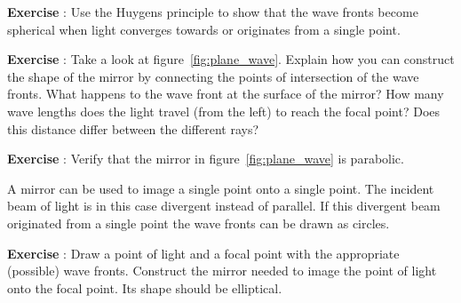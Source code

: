 \documentclass[12pt,a4paper]{article}
\numberwithin{equation}{section}
\numberwithin{figure}{section}
\newcounter{Exercise}
\numberwithin{table}{section}
\begin{document}
\begin{shaded}
\textbf{Exercise \theExercise {}} : Use the Huygens principle to show that the wave fronts become spherical when light converges towards or originates from a single point.\end{shaded}
\begin{shaded}
\textbf{Exercise \theExercise {}} : Take a look at figure~\ref{fig:plane_wave}. Explain how you can construct the shape of the mirror by connecting the points of intersection of the wave fronts. What happens to the wave front at the surface of the mirror? How many wave lengths does the light travel (from the left) to reach the focal point? Does this distance differ between the different rays?\end{shaded}
\begin{shaded}
\textbf{Exercise \theExercise {}} : Verify that the mirror in figure~\ref{fig:plane_wave} is parabolic.\end{shaded}

A mirror can be used to image a single point onto a single point. The incident beam of light is in this case divergent instead of parallel. If this divergent beam originated from a single point the wave fronts can be drawn as circles.
\begin{shaded}
\textbf{Exercise \theExercise {}} : Draw a point of light and a focal point with the appropriate (possible) wave fronts. Construct the mirror needed to image the point of light onto the focal point. Its shape should be elliptical.\end{shaded}
\end{document}
